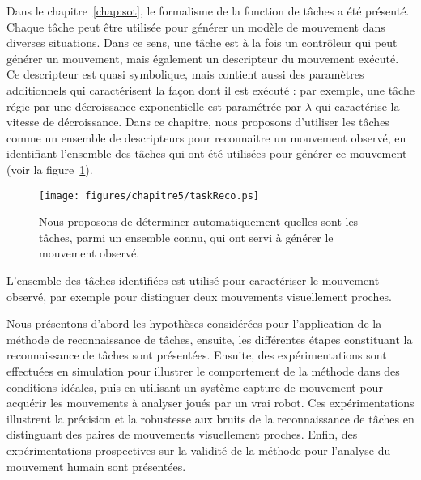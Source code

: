 

Dans le chapitre~\ref{chap:sot}, le formalisme de la fonction de t\^aches 
a été présenté. Chaque t\^ache peut \^etre utilisée pour générer un
modèle de mouvement dans diverses situations.
Dans ce sens, une t\^ache est à la fois un contr\^oleur qui peut 
générer un mouvement, mais également un descripteur du mouvement
exécuté.
Ce descripteur est quasi symbolique, mais contient aussi des paramètres
additionnels qui caractérisent la façon dont il est exécuté : par exemple,
une t\^ache régie par une décroissance exponentielle est paramétrée par
$\lambda$ qui caractérise la vitesse de décroissance. Dans ce chapitre, 
nous proposons d'utiliser les t\^aches comme un ensemble de descripteurs
pour reconnaitre un mouvement observé, en identifiant l'ensemble
des t\^aches qui ont été utilisées pour générer ce mouvement (voir la figure~\ref{fig:taskReco}).

\begin{figure}[t]
  \begin{center}
    \texttt{[image: figures/chapitre5/taskReco.ps]}
  \end{center}
  \caption[La reconnaissance de t\^aches.]{Nous proposons de déterminer automatiquement quelles sont les t\^aches,
  parmi un ensemble connu, qui ont servi à générer le mouvement observé.}
  \label{fig:taskReco}
\end{figure}

L'ensemble des t\^aches identifiées est utilisé pour caractériser le mouvement observé,
par exemple pour distinguer deux mouvements visuellement proches.

Nous présentons d'abord les hypothèses considérées pour l'application
de la méthode de reconnaissance de t\^aches, ensuite, les différentes
étapes constituant la reconnaissance de t\^aches sont présentées.
Ensuite, des expérimentations sont effectuées en simulation pour illustrer le comportement
de la méthode dans des conditions idéales, puis en utilisant
un système capture de mouvement pour acquérir les mouvements à analyser joués par un vrai robot.
Ces expérimentations illustrent la précision et la robustesse aux bruits de la reconnaissance de t\^aches en 
distinguant des paires de mouvements visuellement proches. Enfin,
des expérimentations prospectives sur la validité de la méthode
pour l'analyse du mouvement humain sont présentées.
